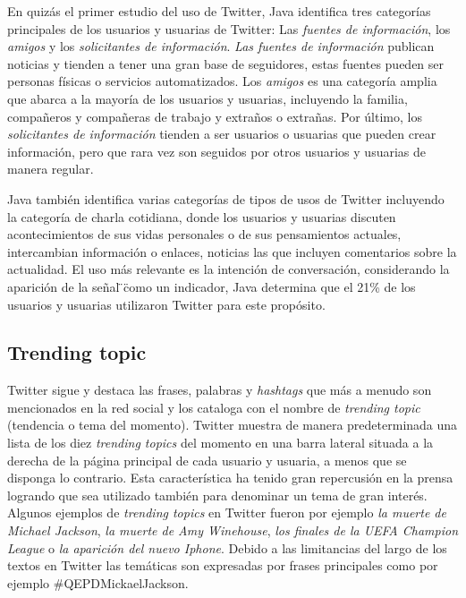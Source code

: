 En quizás el primer estudio del uso de Twitter, Java \cite{JavaEtAl:07} identifica tres categorías principales de los usuarios y usuarias de Twitter: Las \emph{fuentes de información}, los \emph{amigos} y los \emph{solicitantes de información}.
\emph{Las fuentes de información} publican noticias y tienden a tener una gran base de seguidores, estas fuentes pueden ser personas físicas o servicios automatizados. Los \emph{amigos} es una categoría amplia que abarca a la mayoría de los usuarios y usuarias, incluyendo la familia, compañeros y compañeras de trabajo y extraños o extrañas. Por último, los \emph{solicitantes de información} tienden a ser usuarios o usuarias que pueden crear información, pero que rara vez son seguidos por otros usuarios y usuarias de manera regular.

Java \cite{JavaEtAl:07} también identifica varias categorías de tipos de usos de Twitter incluyendo la categoría de charla cotidiana, donde los usuarios y usuarias discuten acontecimientos de sus vidas personales o de sus pensamientos actuales, intercambian información o enlaces, noticias las que incluyen comentarios sobre la actualidad. El uso más relevante es la intención de conversación, considerando la aparición de la señal \"\@\" como un indicador, Java determina que el 21\% de los usuarios y usuarias utilizaron Twitter para este propósito.

\subsection{Trending topic}

Twitter sigue y destaca las frases, palabras y \emph{hashtags} que más a menudo son mencionados en la red social y los cataloga con el nombre de \emph{trending topic} (tendencia o tema del momento).
Twitter muestra de manera predeterminada una lista de los diez \emph{trending topics} del momento en una barra lateral situada a la derecha de la página principal de cada usuario y usuaria, a menos que se disponga lo contrario. Esta característica ha tenido gran repercusión en la prensa logrando que sea utilizado también para denominar un tema de gran interés. Algunos ejemplos de \emph{trending topics} en Twitter fueron por ejemplo \emph{la muerte de Michael Jackson}, \emph{la muerte de Amy Winehouse}, \emph{los finales de la UEFA Champion League} o \emph{la aparición del nuevo Iphone}. Debido a las limitancias del largo de los textos en Twitter las temáticas son expresadas por frases principales como por ejemplo \#QEPDMickaelJackson.

